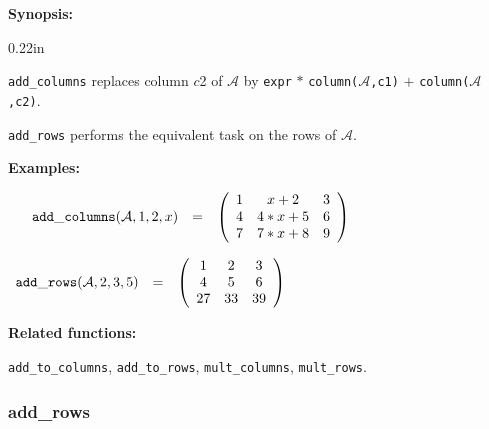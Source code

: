 {\bf Synopsis:} %

\begin{addtolength}{\leftskip}{0.22in}
\parbox[t]{0.95\linewidth}{{\tt add\_columns} replaces column $c$2 of 
$\mathcal{A}$ by \texttt{expr} $*$ \texttt{column($\mathcal{A}$,c1)} $+$ \texttt{column($\mathcal{A}$,c2)}.}

{\tt add\_rows} performs the equivalent task on the rows of $\mathcal{A}$.

\end{addtolength}

{\bf Examples:}

\begin{flushleft}
\begin{math}
\hspace*{0.16in}
\begin{array}{ccc}
{\tt add\_columns}(\mathcal{A},1,2,x) & = & 
\left( \begin{array}{ccc} 1 & x+2 & 3 \\ 4 & 4*x+5 & 6 \\ 7 & 7*x+8 & 9
\end{array} \right)  
\end{array}
\end{math}
\end{flushleft}

\vspace*{0.1in}

\begin{flushleft}
\hspace*{0.1in}
\begin{math}
\begin{array}{ccc}
{\tt add\_rows}(\mathcal{A},2,3,5) & = & 
\left( \begin{array}{ccc} 1 & 2 & 3 \\ 4 & 5 & 6 \\ 27 & 33 & 39 
\end{array} \right)  
\end{array}
\end{math}
\end{flushleft}

{\bf Related functions:}

\hspace*{0.175in} {\tt add\_to\_columns}, {\tt add\_to\_rows}, 
{\tt mult\_columns}, {\tt mult\_rows}.


\subsubsection{add\_rows}
\label{linalg:add_rows}


